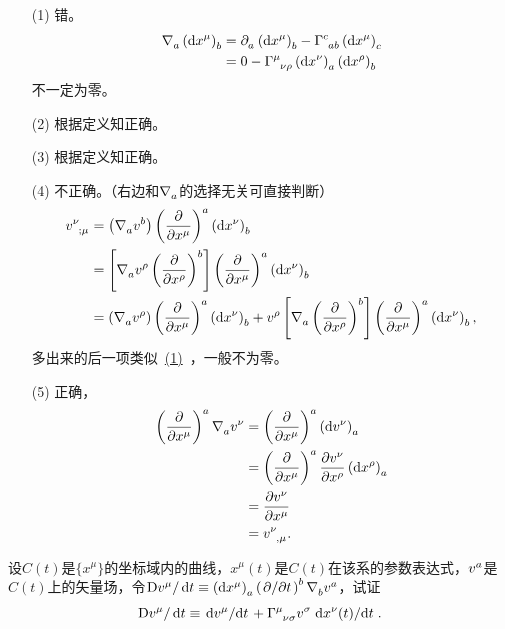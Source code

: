 \begin{xiti}
	\begin{jie}
		\begin{enumerate}
			\item[(1)] 错。
			\begin{align*}
			\Nabla{a} \tensor{\left(\dd{x^\mu}\right)}{_b}&=\Partial{a} \tensor{\left(\dd{x^\mu}\right)}{_b} - \ChristoffelSymbol{c}{a}{b} \tensor{\left(\dd{x^\mu}\right)}{_c}\\
			&=0-\ChristoffelSymbol{\mu}{\nu}{\rho} \tensor{\left(\dd{x^\nu}\right)}{_a} \tensor{\left(\dd{x^\rho}\right)}{_b}
			\end{align*}
			不一定为零。
			\item[(2)] 根据定义知正确。
			\item[(3)] 根据定义知正确。
			\item[(4)] 不正确。（右边和$\Nabla{a}$的选择无关可直接判断）
			\begin{align*}
			\tensor{v}{^\nu_{;\mu}}&= \left(\Nabla{a} \tensor{v}{^b} \right) \tensor{\left(\pdv{x^\mu} \right)}{^a} \tensor{\left(\dd{x^\nu}\right)}{_b}\\
			&= \left[\Nabla{a} \tensor{v}{^\rho} \tensor{\left(\pdv{x^\rho}\right)}{^b} \right] \tensor{\left(\pdv{x^\mu} \right)}{^a} \tensor{\left(\dd{x^\nu}\right)}{_b}\\
			&=\left(\Nabla{a} \tensor{v}{^\rho} \right) \tensor{\left(\pdv{x^\mu} \right)}{^a} \tensor{\left(\dd{x^\nu}\right)}{_b} +\tensor{v}{^\rho} \left[ \Nabla{a} \tensor{\left( \pdv{x^\rho} \right)}{^b} \right] \tensor{\left(\pdv{x^\mu} \right)}{^a} \tensor{\left(\dd{x^\nu}\right)}{_b},
			\end{align*}
			多出来的后一项类似~\hyperlink{3.5.1}{(1)}~，一般不为零。
			\item[(5)] 正确，
			\begin{align*}
			\tensor{\left(\pdv{x^\mu}\right)}{^a} \Nabla{a} \tensor{v}{^\nu}&=\tensor{\left(\pdv{x^\mu}\right)}{^a} \tensor{\left(\dd{v^\nu}\right)}{_a} \\
			&=\tensor{\left(\pdv{x^\mu}\right)}{^a} \pdv{\tensor{v}{^\nu}}{x^\rho} \tensor{\left(\dd{x^\rho}\right)}{_a}\\
			&=\pdv{ \tensor{v}{^\nu}}{x^\mu}\\
			&=\tensor{v}{^\nu_{,\mu}}.
			\end{align*}
		\end{enumerate}
	\end{jie}

	\item 设$C(t) $是$\{x^\mu\}$的坐标域内的曲线，$x^\mu (t)$是$C(t)$在该系的参数表达式，$\tensor{v}{^a}$是$C(t)$上的矢量场，令$\mathrm{D}\tensor{v}{^\mu} / \dd{t} \equiv \tensor{\left(\dd{x^\mu}\right)}{_a} \tensor{\left(\pd{t}\right)}{^b} \Nabla{b} \tensor{v}{^a} $，试证
	\begin{displaymath}
	\mathrm{D} \tensor{v}{^\mu} / \dd{t} \equiv \dv*{\tensor{v}{^\mu}}{t} + \ChristoffelSymbol{\mu}{\nu}{\sigma} \tensor{v}{^\sigma} \dv*{x^\nu (t)}{t}.
	\end{displaymath}


\end{xiti}
